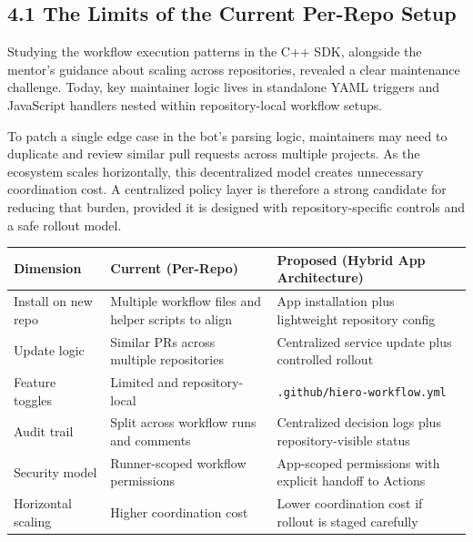 \documentclass[11pt]{article}
\newcommand{\mainheading}[1]{\par\vspace{10pt}\noindent{\fontsize{15pt}{18pt}\selectfont\textcolor{headingblue}{#1}}
\par\vspace{4pt}}
\begin{document}
\mainheading{4. Codebase Analysis and Architecture Findings}

\subsection*{4.1 The Limits of the Current Per-Repo Setup}

Studying the workflow execution patterns in the C++ SDK, alongside the mentor's guidance about scaling across repositories, revealed a clear maintenance challenge. Today, key maintainer logic lives in standalone YAML triggers and JavaScript handlers nested within repository-local workflow setups. 

To patch a single edge case in the bot's parsing logic, maintainers may need to duplicate and review similar pull requests across multiple projects. As the ecosystem scales horizontally, this decentralized model creates unnecessary coordination cost. A centralized policy layer is therefore a strong candidate for reducing that burden, provided it is designed with repository-specific controls and a safe rollout model.

\begin{table}[H]
\centering
\renewcommand{\arraystretch}{1.3}
\begin{tabularx}{\textwidth}{@{} l X X @{}}
\toprule
\textbf{Dimension} & \textbf{Current (Per-Repo)} & \textbf{Proposed (Hybrid App Architecture)} \\
\midrule
Install on new repo & Multiple workflow files and helper scripts to align & App installation plus lightweight repository config \\
Update logic & Similar PRs across multiple repositories & Centralized service update plus controlled rollout \\
Feature toggles & Limited and repository-local & \texttt{.github/hiero-workflow.yml} \\
Audit trail & Split across workflow runs and comments & Centralized decision logs plus repository-visible status \\
Security model & Runner-scoped workflow permissions & App-scoped permissions with explicit handoff to Actions \\
Horizontal scaling & Higher coordination cost & Lower coordination cost if rollout is staged carefully \\
\bottomrule
\end{tabularx}
\end{table}
\end{document}
